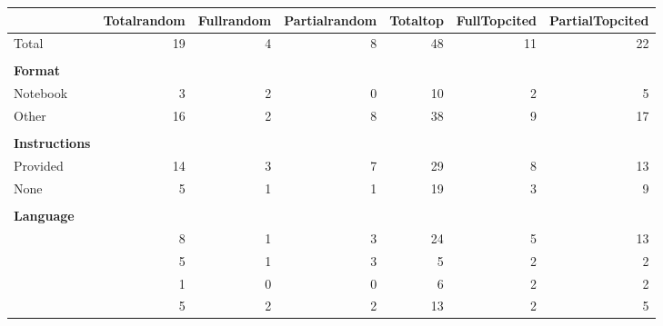 \begin{tabular}{l|rrrrrr}
  \hline
 & Totalrandom & Fullrandom & Partialrandom & Totaltop & FullTopcited & PartialTopcited \\ 
  \hline
{Total} & 19 & 4 & 8 & 48 & 11 & 22 \\ 
   &  &  &  &  &  &  \\ 
  \textbf{Format} &  &  &  &  &  &  \\ 
  {Notebook} & 3 & 2 & 0 & 10 & 2 & 5 \\ 
  {Other} & 16 & 2 & 8 & 38 & 9 & 17 \\ 
    &  &  &  &  &  &  \\ 
  \textbf{Instructions} &  &  &  &  &  &  \\ 
  {Provided} & 14 & 3 & 7 & 29 & 8 & 13 \\ 
  {None} & 5 & 1 & 1 & 19 & 3 & 9 \\ 
     &  &  &  &  &  &  \\ 
  \textbf{Language} &  &  &  &  &  &  \\ 
  \hspace{5mm}{R} & 8 & 1 & 3 & 24 & 5 & 13 \\ 
  \hspace{5mm}{Matlab} & 5 & 1 & 3 & 5 & 2 & 2 \\ 
  \hspace{5mm}{Python} & 1 & 0 & 0 & 6 & 2 & 2 \\ 
  \hspace{5mm}{Other} & 5 & 2 & 2 & 13 & 2 & 5 \\ 
   \hline
\end{tabular}
